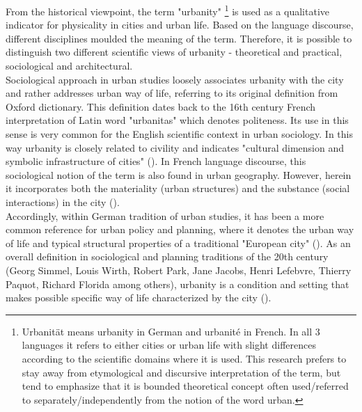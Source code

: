 \documentclass[11pt]{report}
\begin{document}
From the historical viewpoint, the term "urbanity"
\footnote{Urbanität means urbanity in German and urbanité in French. In all 3 languages it refers to either cities or urban life with slight differences according to the scientific domains where it is used.
This research prefers to stay away from etymological and discursive interpretation of the term, but tend to emphasize that it is bounded theoretical concept often used/referred to separately/independently from the notion of the word urban.}
is used as a qualitative indicator for physicality in cities and urban life. 
Based on the language discourse, different disciplines moulded the meaning of the term.
Therefore, it is possible to distinguish two different scientific views of urbanity - theoretical and practical, sociological and architectural.
\\

Sociological approach in urban studies loosely associates urbanity with the city and rather addresses urban way of life, referring to its original definition from Oxford dictionary.
This definition dates back to the 16th century French interpretation of Latin word "urbanitas" which denotes politeness.
Its use in this sense is very common for the English scientific context in urban sociology.
In this way urbanity is closely related to civility  and indicates "cultural dimension and symbolic infrastructure of cities" (\href{Zijderveld}{\citealt{zijderveld_theory_2011}}).
In French language discourse, this sociological notion of the term is also found in urban geography. However, herein it incorporates both the materiality (urban structures) and the substance (social interactions) in the city (\citealt{Bisson 2016}). 
\\

Accordingly, within German tradition of urban studies, it has been a more common reference for urban policy and planning, where it denotes the urban way of life and typical structural properties of a traditional "European city" (\citealt{(Prigge 1996, Wust 2005, Lossau 2008})\href{Lossau}{\citealt{lossau_new_2008}}. 
As an overall definition in sociological and planning traditions of the 20th century (Georg Simmel, Louis Wirth, Robert Park, Jane Jacobs, Henri Lefebvre, Thierry Paquot, Richard Florida among others), urbanity is a condition and setting that makes possible specific way of life characterized by the city (\cite{Lévy 2013}). 
\\
\end{document}
